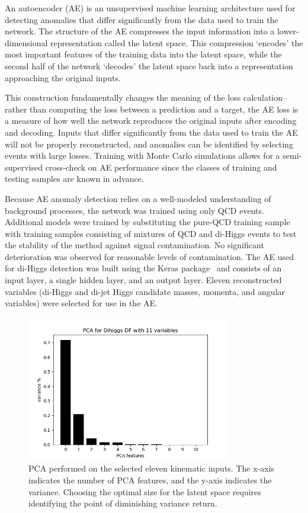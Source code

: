 \label{sec:AE}

An autoencoder (AE) is an unsupervised machine learning architecture used for detecting anomalies that differ significantly from the data used to train the network. The structure of the AE compresses the input information into a lower-dimensional representation called the latent space. This compression `encodes' the most important features of the training data into the latent space, while the second half of the network `decodes' the latent space back into a representation approaching the original inputs.

This construction fundamentally changes the meaning of the loss calculation-- rather than computing the loss between a prediction and a target, the AE loss is a measure of how well the network reproduces the original inputs after encoding and decoding. Inputs that differ significantly from the data used to train the AE will not be properly reconstructed, and anomalies can be identified by selecting events with large losses. Training with Monte Carlo simulations allows for a semi-supervised cross-check on AE performance since the classes of training and testing samples are known in advance.

Because AE anomaly detection relies on a well-modeled understanding of background processes, the network was trained using only QCD events. Additional models were trained by substituting the pure-QCD training sample with training samples consisting of mixtures of QCD and di-Higgs events to test the stability of the method against signal contamination. No significant deterioration was observed for reasonable levels of contamination. The AE used for di-Higgs detection was built using the Keras package~\cite{chollet2015keras} and consists of an input layer, a single hidden layer, and an output layer. Eleven reconstructed variables (di-Higgs and di-jet Higgs candidate masses, momenta, and angular variables) were selected for use in the AE. 

\begin{figure}[!h] 
\begin{center}
\includegraphics*[width=3.5in] {AE/figures/ae_PCA_11vars}
\caption{PCA performed on the selected eleven kinematic inputs. The x-axis indicates the number of PCA features, and the y-axis indicates the variance. Choosing the optimal size for the latent space requires identifying the point of diminishing variance return.}
  \label{fig:ae_pca}
\end{center}
\end{figure}

